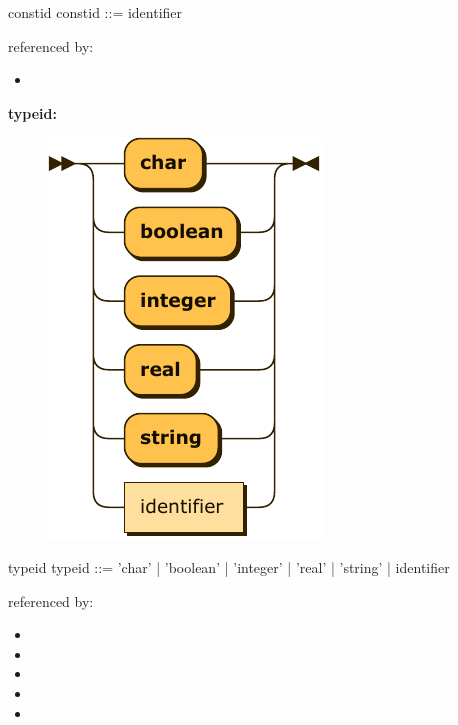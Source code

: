 \documentclass[10pt,a4paper,twoside]{article}
\providecommand{\tightlist}{%
  \setlength{\itemsep}{0pt}\setlength{\parskip}{0pt}}
\newcounter{grammarbox}[section]
\begin{document}
\begin{grammarbox}{constid}
\vspace{0.5em}
constid  ::= identifier
\end{grammarbox}

referenced by:

\begin{itemize}
\tightlist
\item
\end{itemize}

\textbf{typeid:}

\begin{figure}[H]
\centering
\includegraphics{diagram/typeid.pdf}

\end{figure}

\begin{grammarbox}{typeid}
\vspace{0.5em}
typeid   ::= 'char'
           | 'boolean'
           | 'integer'
           | 'real'
           | 'string'
           | identifier
\end{grammarbox}

referenced by:

\begin{itemize}
\tightlist
\item
\item
\item
\item
\item
\end{itemize}
\end{document}

